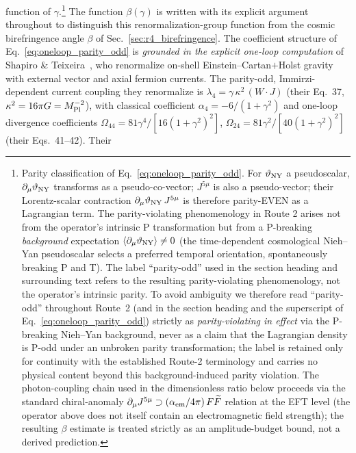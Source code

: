 \documentclass[aps,prd,twocolumn,superscriptaddress,showpacs,preprintnumbers,nofootinbib,longbibliography,floatfix]{revtex4-2}
\begin{document}
function of $\gamma$.\footnote{Parity classification of
Eq.~\eqref{eq:oneloop_parity_odd}. For $\vartheta_{\rm NY}$ a pseudoscalar,
$\partial_\mu\vartheta_{\rm NY}$ transforms as a pseudo-co-vector; $J^{5\mu}$
is also a pseudo-vector; their Lorentz-scalar contraction
$\partial_\mu\vartheta_{\rm NY}\,J^{5\mu}$ is therefore parity-EVEN as a
Lagrangian term. The parity-violating phenomenology in Route 2 arises not
from the operator's intrinsic P transformation but from a P-breaking
\emph{background} expectation $\langle\partial_\mu\vartheta_{\rm NY}\rangle\neq 0$
(the time-dependent cosmological Nieh--Yan pseudoscalar selects a preferred
temporal orientation, spontaneously breaking P and T). The label
``parity-odd'' used in the section heading and surrounding text refers to
the resulting parity-violating phenomenology, not the operator's intrinsic
parity. To avoid ambiguity we therefore read ``parity-odd'' throughout Route~2
(and in the section heading and the superscript of
Eq.~\eqref{eq:oneloop_parity_odd}) strictly as \emph{parity-violating in effect}
via the P-breaking Nieh--Yan background, never as a claim that the Lagrangian
density is P-odd under an unbroken parity transformation; the label is retained
only for continuity with the established Route-2 terminology and carries no
physical content beyond this background-induced parity violation. The photon-coupling chain
used in the dimensionless ratio below proceeds via the standard
chiral-anomaly
$\partial_\mu J^{5\mu} \supset (\alpha_{\rm em}/4\pi)\,F\widetilde F$
relation at the EFT level (the operator above does not itself contain
an electromagnetic field strength); the resulting $\beta$ estimate is
treated strictly as an amplitude-budget bound, not a derived
prediction.} The function
$\beta(\gamma)$ is written with its explicit argument throughout to
distinguish this renormalization-group function from the cosmic
birefringence angle $\beta$ of Sec.~\ref{sec:r4_birefringence}. The
coefficient structure of Eq.~\eqref{eq:oneloop_parity_odd} is
\emph{grounded in the explicit one-loop computation} of Shapiro \&
Teixeira~\cite{ShapiroTeixeira2014}, who renormalize on-shell
Einstein--Cartan${+}$Holst gravity with external vector and axial
fermion currents. The parity-odd, Immirzi-dependent current coupling
they renormalize is $\lambda_4=\gamma\,\kappa^2\,(W\!\cdot\!J)$ (their
Eq.~37, $\kappa^2=16\pi G=M_{\rm Pl}^{-2}$), with classical coefficient
$\alpha_4=-6/(1+\gamma^2)$ and one-loop divergence coefficients
$\Omega_{44}=81\gamma^4/[16(1+\gamma^2)^2]$,
$\Omega_{24}=81\gamma^2/[40(1+\gamma^2)^2]$ (their Eqs.~41--42). Their
\end{document}

